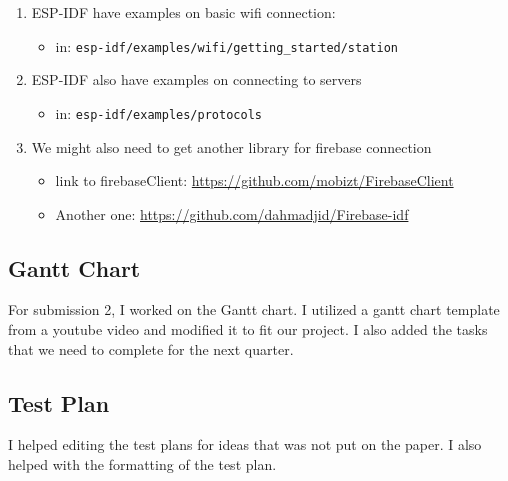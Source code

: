 \begin{enumerate}
    \item ESP-IDF have examples on basic wifi connection:
    \begin{itemize}
        \item in: \texttt{esp-idf/examples/wifi/getting\_started/station}
    \end{itemize}
    \item ESP-IDF also have examples on connecting to servers
    \begin{itemize}
        \item in: \texttt{esp-idf/examples/protocols}
    \end{itemize}
    \item We might also need to get another library for firebase connection
    \begin{itemize}
        \item link to firebaseClient: \url{https://github.com/mobizt/FirebaseClient}
        \item Another one: \url{https://github.com/dahmadjid/Firebase-idf}
    \end{itemize}
\end{enumerate}

\subsection{Gantt Chart}
For submission 2, I worked on the Gantt chart. I utilized a gantt chart template from a youtube video and modified it to fit our project. I also added the tasks that we need to complete for the next quarter.

\subsection{Test Plan}
I helped editing the test plans for ideas that was not put on the paper. I also helped with the formatting of the test plan.